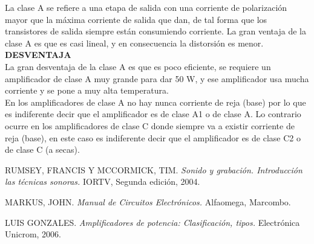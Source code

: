 \documentclass[11pt,a4paper]{article}
\begin{document}
\begin{itemize}
La clase A se refiere a una etapa de salida con una corriente de polarización mayor que la máxima corriente de salida que dan, de tal forma que los transistores de salida siempre están consumiendo corriente. La gran ventaja de la clase A es que es casi lineal, y en consecuencia la distorsión es menor.\\

\textbf{DESVENTAJA}\\

La gran desventaja de la clase A es que es poco eficiente, se requiere un amplificador de clase A muy grande para dar 50 W, y ese amplificador usa mucha corriente y se pone a muy alta temperatura.\\

En los amplificadores de clase A no hay nunca corriente de reja (base) por lo que es indiferente decir que el amplificador es de clase A1 o de clase A. Lo contrario ocurre en los amplificadores de clase C donde siempre va a existir corriente de reja (base), en este caso es indiferente decir que el amplificador es de clase C2 o de clase C (a secas).


\end{itemize} 

\newpage



\begin{thebibliography}{X}
 \textsc{RUMSEY, FRANCIS Y MCCORMICK, TIM.} \textit{Sonido y grabación. Introducción las técnicas sonoras.} IORTV, Segunda edición, 2004.

 \textsc{MARKUS, JOHN.} \textit{Manual de Circuitos Electrónicos.} 
Alfaomega, Marcombo.


 \textsc{LUIS GONZALES.} \textit{Amplificadores de potencia: Clasificación, tipos.} 
Electrónica Unicrom, 2006.
\end{thebibliography}


\end{document}
